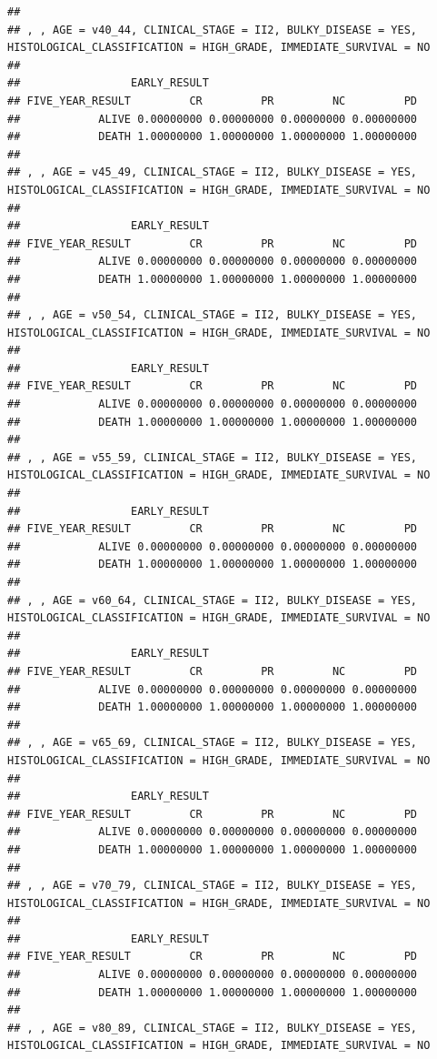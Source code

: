 \documentclass[]{article}
\begin{document}
\begin{verbatim}
## 
## , , AGE = v40_44, CLINICAL_STAGE = II2, BULKY_DISEASE = YES, HISTOLOGICAL_CLASSIFICATION = HIGH_GRADE, IMMEDIATE_SURVIVAL = NO
## 
##                 EARLY_RESULT
## FIVE_YEAR_RESULT         CR         PR         NC         PD
##            ALIVE 0.00000000 0.00000000 0.00000000 0.00000000
##            DEATH 1.00000000 1.00000000 1.00000000 1.00000000
## 
## , , AGE = v45_49, CLINICAL_STAGE = II2, BULKY_DISEASE = YES, HISTOLOGICAL_CLASSIFICATION = HIGH_GRADE, IMMEDIATE_SURVIVAL = NO
## 
##                 EARLY_RESULT
## FIVE_YEAR_RESULT         CR         PR         NC         PD
##            ALIVE 0.00000000 0.00000000 0.00000000 0.00000000
##            DEATH 1.00000000 1.00000000 1.00000000 1.00000000
## 
## , , AGE = v50_54, CLINICAL_STAGE = II2, BULKY_DISEASE = YES, HISTOLOGICAL_CLASSIFICATION = HIGH_GRADE, IMMEDIATE_SURVIVAL = NO
## 
##                 EARLY_RESULT
## FIVE_YEAR_RESULT         CR         PR         NC         PD
##            ALIVE 0.00000000 0.00000000 0.00000000 0.00000000
##            DEATH 1.00000000 1.00000000 1.00000000 1.00000000
## 
## , , AGE = v55_59, CLINICAL_STAGE = II2, BULKY_DISEASE = YES, HISTOLOGICAL_CLASSIFICATION = HIGH_GRADE, IMMEDIATE_SURVIVAL = NO
## 
##                 EARLY_RESULT
## FIVE_YEAR_RESULT         CR         PR         NC         PD
##            ALIVE 0.00000000 0.00000000 0.00000000 0.00000000
##            DEATH 1.00000000 1.00000000 1.00000000 1.00000000
## 
## , , AGE = v60_64, CLINICAL_STAGE = II2, BULKY_DISEASE = YES, HISTOLOGICAL_CLASSIFICATION = HIGH_GRADE, IMMEDIATE_SURVIVAL = NO
## 
##                 EARLY_RESULT
## FIVE_YEAR_RESULT         CR         PR         NC         PD
##            ALIVE 0.00000000 0.00000000 0.00000000 0.00000000
##            DEATH 1.00000000 1.00000000 1.00000000 1.00000000
## 
## , , AGE = v65_69, CLINICAL_STAGE = II2, BULKY_DISEASE = YES, HISTOLOGICAL_CLASSIFICATION = HIGH_GRADE, IMMEDIATE_SURVIVAL = NO
## 
##                 EARLY_RESULT
## FIVE_YEAR_RESULT         CR         PR         NC         PD
##            ALIVE 0.00000000 0.00000000 0.00000000 0.00000000
##            DEATH 1.00000000 1.00000000 1.00000000 1.00000000
## 
## , , AGE = v70_79, CLINICAL_STAGE = II2, BULKY_DISEASE = YES, HISTOLOGICAL_CLASSIFICATION = HIGH_GRADE, IMMEDIATE_SURVIVAL = NO
## 
##                 EARLY_RESULT
## FIVE_YEAR_RESULT         CR         PR         NC         PD
##            ALIVE 0.00000000 0.00000000 0.00000000 0.00000000
##            DEATH 1.00000000 1.00000000 1.00000000 1.00000000
## 
## , , AGE = v80_89, CLINICAL_STAGE = II2, BULKY_DISEASE = YES, HISTOLOGICAL_CLASSIFICATION = HIGH_GRADE, IMMEDIATE_SURVIVAL = NO

\end{verbatim}
\end{document}
